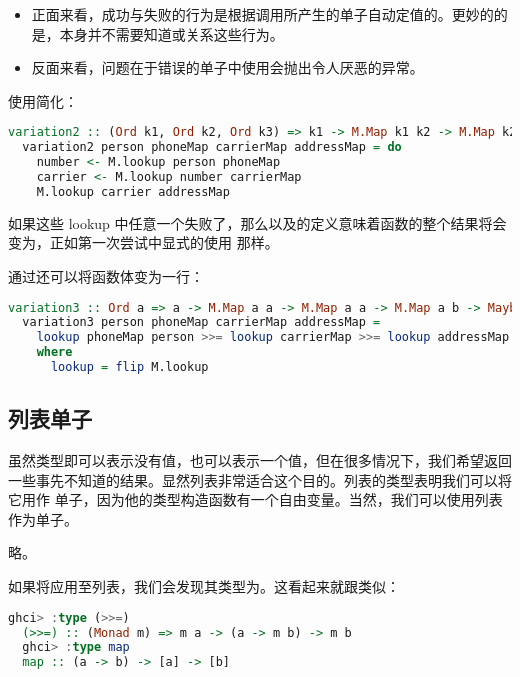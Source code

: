 \documentclass[./main.tex]{subfiles}
\begin{document}
\begin{itemize}
  \item 正面来看，成功与失败的行为是根据调用所产生的单子自动定值的。更妙的的是，本身并不需要知道或关系这些行为。
  \item 反面来看，问题在于错误的单子中使用会抛出令人厌恶的异常。
\end{itemize}

使用简化：

\begin{lstlisting}[language=Haskell]
  variation2 :: (Ord k1, Ord k2, Ord k3) => k1 -> M.Map k1 k2 -> M.Map k2 k3 -> M.Map k3 b -> Maybe b
  variation2 person phoneMap carrierMap addressMap = do
    number <- M.lookup person phoneMap
    carrier <- M.lookup number carrierMap
    M.lookup carrier addressMap
\end{lstlisting}

如果这些 lookup 中任意一个失败了，那么\acode{(>>=)}以及\acode{(>>)}的定义意味着函数的整个结果将会变为，正如第一次尝试中显式的使用
那样。

通过还可以将函数体变为一行：

\begin{lstlisting}[language=Haskell]
  variation3 :: Ord a => a -> M.Map a a -> M.Map a a -> M.Map a b -> Maybe b
  variation3 person phoneMap carrierMap addressMap =
    lookup phoneMap person >>= lookup carrierMap >>= lookup addressMap
    where
      lookup = flip M.lookup
\end{lstlisting}

\subsection*{列表单子}

虽然类型即可以表示没有值，也可以表示一个值，但在很多情况下，我们希望返回一些事先不知道的结果。显然列表非常适合这个目的。列表的类型表明我们可以将它用作
单子，因为他的类型构造函数有一个自由变量。当然，我们可以使用列表作为单子。

略。

如果将\acode{(>>=)}应用至列表，我们会发现其类型为。这看起来就跟类似：

\begin{lstlisting}[language=Haskell]
  ghci> :type (>>=)
  (>>=) :: (Monad m) => m a -> (a -> m b) -> m b
  ghci> :type map
  map :: (a -> b) -> [a] -> [b]
\end{lstlisting}
\end{document}
